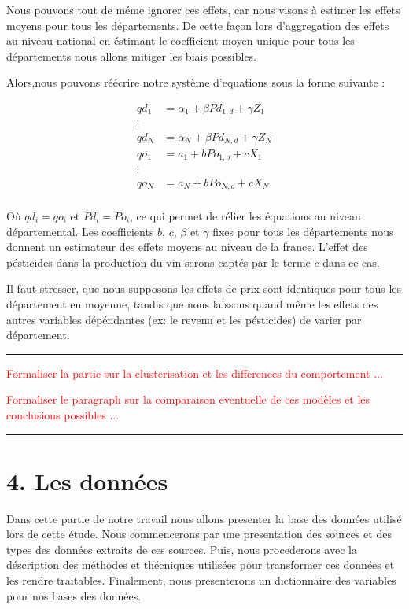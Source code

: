 \documentclass[11pt,]{article}
\begin{document}
Nous pouvons tout de méme ignorer ces effets, car nous visons à estimer
les effets moyens pour tous les départements. De cette façon lors
d'aggregation des effets au niveau national en éstimant le coefficient
moyen unique pour tous les départements nous allons mitiger les biais
possibles.

Alors,nous pouvons réécrire notre système d'equations sous la forme
suivante :

\begin{align*}
  qd_1 & = \alpha_{1} + \beta Pd_{1,d} + \gamma Z_{1} \\
  \vdots \\ 
  qd_N & = \alpha_{N} + \beta Pd_{N,d} + \gamma Z_{N} \\
  qo_1 & = a_1 + b Po_{1,o} + c X_{1} \\ 
  \vdots \\ 
  qo_N & = a_N + b Po_{N,o} + c X_{N} \\
\end{align*}

Où \(qd_i = qo_i\) et \(Pd_i = Po_i\), ce qui permet de rélier les
équations au niveau départemental. Les coefficients \(b\), \(c\),
\(\beta\) et \(\gamma\) fixes pour tous les départements nous donnent un
estimateur des effets moyens au niveau de la france. L'effet des
pésticides dans la production du vin serons captés par le terme \(c\)
dans ce cas.

Il faut stresser, que nous supposons les effets de prix sont identiques
pour tous les département en moyenne, tandis que nous laissons quand
même les effets des autres variables dépéndantes (ex: le revenu et les
pésticides) de varier par département.

\noindent

\rule[0.5ex]{\linewidth}{1pt}

\textcolor{red}{Formaliser la partie sur la clusterisation et les differences du comportement ...}

\textcolor{red}{Formaliser le paragraph sur la comparaison eventuelle de ces modèles et les conclusions possibles ...}

\noindent

\rule[0.5ex]{\linewidth}{1pt}

\hypertarget{les-donnees}{%
\section{4. Les données}\label{les-donnees}}

Dans cette partie de notre travail nous allons presenter la base des
données utilisé lors de cette étude. Nous commencerons par une
presentation des sources et des types des données extraits de ces
sources. Puis, nous procederons avec la déscription des méthodes et
thécniques utilisées pour transformer ces données et les rendre
traitables. Finalement, nous presenterons un dictionnaire des variables
pour nos bases des données.
\end{document}
